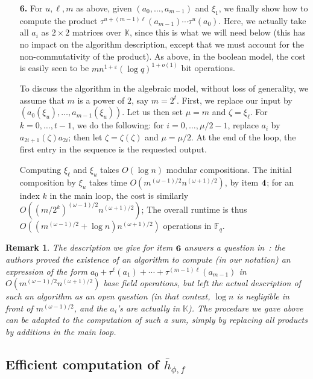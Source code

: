 \documentclass[12pt]{article}
\newtheorem{remark}{Remark}
\def\F{\ensuremath{\mathbb{F}}}
\def\K{\ensuremath{\mathbb{K}}}
\begin{document}
\begin{enumerate}
\item [{\bf 6.}] For $u,\ell,m$ as above, given $(a_0,\dots,a_{m-1})$
  and $\xi_1$, we finally show how to compute the product
  $\tau^{u+(m-1)\ell}(a_{m-1}) \cdots \tau^{u}(a_0).$ Here, we
  actually take all $a_i$ as $2\times 2$ matrices over $\K$, since
  this is what we will need below (this has no impact on the algorithm
  description, except that we must account for the non-commutativity
  of the product). As above, in the boolean model, the cost is easily
  seen to be $m n^{1+\varepsilon} (\log q)^{1+o(1)}$ bit operations.
  
  To discuss the algorithm in the algebraic model, without loss of
  generality, we assume that $m$ is a power of $2$, say
  $m=2^t$. First, we replace our input by
  $(a_0(\xi_u),\dots,a_{m-1}(\xi_u))$. Let us then set $\mu=m$ and
  $\zeta=\xi_\ell$.  For $k=0,\dots,t-1$, we do the following: for
  $i=0,\dots,\mu/2-1$, replace $a_i$ by $a_{2i+1}(\zeta) a_{2i}$; then
  let $\zeta=\zeta(\zeta)$ and $\mu=\mu/2$.  At the end of the loop,
  the first entry in the sequence is the requested output.

  Computing $\xi_\ell$ and $\xi_u$ takes $O(\log n)$ modular
  compositions.  The initial composition by $\xi_u$ takes time
  $O(m^{(\omega-1)/2}n^{(\omega+1)/2})$, by item ${\bf 4}$; for an
  index $k$ in the main loop, the cost is similarly
  $O((m/2^k)^{(\omega-1)/2}n^{(\omega+1)/2})$; The overall runtime is
  thus $O((m^{(\omega-1)/2}+\log n)n^{(\omega+1)/2})$
  operations in $\F_q$.
\end{enumerate}


\begin{remark}
  The description we give for item ${\bf 6}$ answers a question
  in~\cite[Section~3.2]{ks}: the authors proved the existence of an
  algorithm to compute (in our notation) an expression of the form
  $a_0 + \tau^\ell(a_1) + \cdots + \tau^{(m-1)\ell}(a_{m-1})$
in
  $O(m^{(\omega-1)/2}n^{(\omega+1)/2})$ base field operations, but left
  the actual description of such an algorithm as an open question
  (in that context, $\log n$ is negligible in front of $m^{(\omega-1)/2}$,
  and the $a_i$'s are actually in $\K$).
  The procedure we gave above can be adapted to the computation
  of such a sum, simply by replacing all products by additions 
  in the main loop.
\end{remark}


\subsection{Efficient computation of $\bar h_{\phi,f}$}
\end{document}
